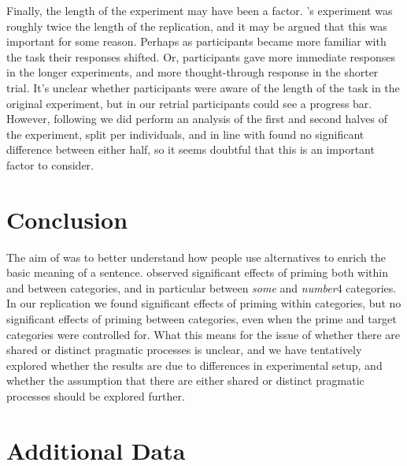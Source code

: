 \documentclass[10pt]{article}
\begin{document}
\begin{multicols}{2}
Finally, the length of the experiment may have been a factor.
\citeauthor{Bott:2016aa}'s experiment was roughly twice the length of the replication, and it may be argued that this was important for some reason.
Perhaps as participants became more familiar with the task their responses shifted.
Or, participants gave more immediate responses in the longer experiments, and more thought-through response in the shorter trial.
It's unclear whether participants were aware of the length of the task in the original experiment, but in our retrial participants could see a progress bar.
However, following \citeauthor{Bott:2016aa} we did perform an analysis of the first and second halves of the experiment, split per individuals, and in line with \citeauthor{Bott:2016aa} found no significant difference between either half, so it seems doubtful that this is an important factor to consider.

\section{Conclusion}
\label{sec:conclusion}

The aim of \textcite{Bott:2016aa} was to better understand how people use alternatives to enrich the basic meaning of a sentence.
\citeauthor{Bott:2016aa} observed significant effects of priming both within and between categories, and in particular between \emph{some} and \emph{number}4 categories.
In our replication we found significant effects of priming within categories, but no significant effects of priming between categories, even when the prime and target categories were controlled for.
What this means for the issue of whether there are shared or distinct pragmatic processes is unclear, and we have tentatively explored whether the results are due to differences in experimental setup, and whether the assumption that there are either shared or distinct pragmatic processes should be explored further.

\end{multicols}

\vfill
\printbibliography



\newpage
\appendix

\section{Additional Data}
\end{document}
